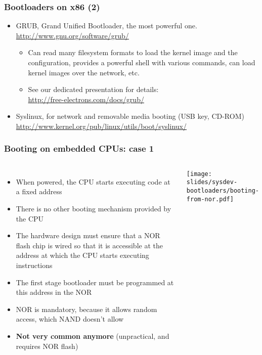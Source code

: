 \begin{frame}
  \frametitle{Bootloaders on x86 (2)}
  \begin{itemize}
  \item GRUB, Grand Unified Bootloader, the most powerful one.\\
    \url{http://www.gnu.org/software/grub/}
    \begin{itemize}
    \item Can read many filesystem formats to load the kernel image
      and the configuration, provides a powerful shell with various
      commands, can load kernel images over the network, etc.
    \item See our dedicated presentation for details:\\
      \url{http://free-electrons.com/docs/grub/}
    \end{itemize}
  \item Syslinux, for network and removable media booting (USB key, CD-ROM)\\
    \small\url{http://www.kernel.org/pub/linux/utils/boot/syslinux/}\normalsize
  \end{itemize}
\end{frame}

\begin{frame}
  \frametitle{Booting on embedded CPUs: case 1}
  \begin{columns}
    \begin{itemize}
    \item When powered, the CPU starts executing code at a fixed address
    \item There is no other booting mechanism provided by the CPU
    \item The hardware design must ensure that a NOR flash chip is
      wired so that it is accessible at the address at which the CPU
      starts executing instructions
    \item The first stage bootloader must be programmed at this
      address in the NOR
    \item NOR is mandatory, because it allows random access, which
      NAND doesn't allow
    \item {\bf Not very common anymore} (unpractical, and requires NOR
      flash)
    \end{itemize}
    \texttt{[image: slides/sysdev-bootloaders/booting-from-nor.pdf]}
  \end{columns}
\end{frame}


